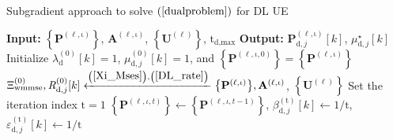 \documentclass[10pt,journal]{IEEEtran}
\newcommand{\paren}[1]{\left({#1}\right)}
\newcommand{\bracket}[1]{{\left [{#1}\right ]}}
\newcommand{\braces}[1]{{\left\{ {#1}\right\}}}
\newcommand{\sfrac}[2]{#1/#2}
\theoremstyle{definition}
\begin{document}
	\begin{algorithm}[ht!]
		\caption{Subgradient approach to solve $\paren{\ref{dualproblem}}$ for DL UE}
		\label{DLalgorithm}
		\begin{algorithmic}[1]
			\Statex \textbf{Input: } $\braces{\mathbf{P}^{\paren{\mathrm{\ell,\iota}}}}$,  $\mathbf{A}^{\paren{\mathrm{\ell,\iota}}}$, $\braces{\mathbf{U}^{\paren{\mathrm{\ell}}}}$, $\mathrm{t}_{\textrm{d,max}}$
			\Statex \textbf{Output:} $\mathbf{P}^{\paren{\mathrm{\ell,\iota}}}_{\textrm{d},j}\bracket{k}$, $\mu^\star_{\textrm{d},j}\bracket{k}$
			\State Initialize $\lambda^{\paren{\mathrm{0}}}_{\textrm{d}}\bracket{k}=1$, $\mu^{\paren{\mathrm{0}}}_{\textrm{d},j}\bracket{k}=1$, and $\braces{\mathbf{P}^{\paren{\ell,\iota,0}}}=\braces{\mathbf{P}^{\paren{\mathrm{\ell,\iota}}}}$ 
			\State $\Xi^{\paren{\mathrm{0}}}_{\textrm{wmmse}},\mathit{R}^{\paren{\mathrm{0}}}_{\textrm{d},j}\bracket{k}\xleftarrow{\paren{\mathrm{\ref{Xi_Mses}}},\paren{\mathrm{\ref{DL_rate}}}}\braces{\mathbf{P}^{\paren{\mathrm{\ell,\iota}}}},\mathbf{A}^{\paren{\mathrm{\ell,\iota}}}$, $\braces{\mathbf{U}^{\paren{\mathrm{\ell}}}}$
			\State Set the iteration index $\mathrm{t}=1$
			\Repeat
			\State $\braces{\mathbf{P}^{\paren{\ell,\iota,t}}}\leftarrow\braces{\mathbf{P}^{\paren{\ell,\iota,t-1}}}$, $\beta^{\paren{\mathrm{t}}}_{\textrm{d},j}\bracket{k}\leftarrow\sfrac{1}{\mathrm{t}}$, $\varepsilon^{\paren{\mathrm{t}}}_{\textrm{d},j}\bracket{k}\leftarrow\sfrac{1}{\mathrm{t}}$

\end{algorithmic}
\end{algorithm}
\end{document}

